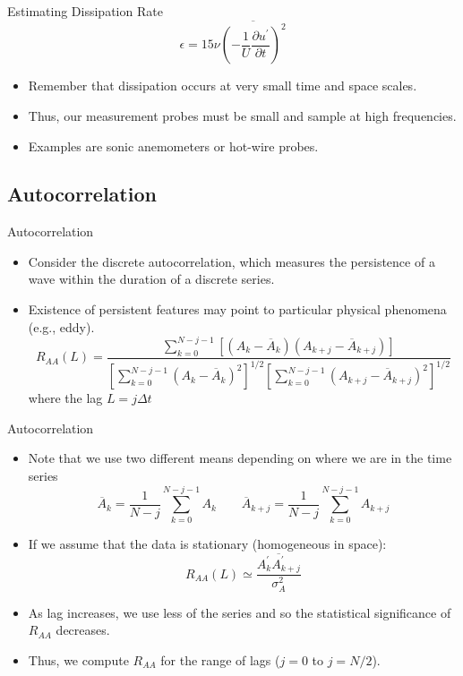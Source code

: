 \begin{frame}{Estimating Dissipation Rate}
$$\epsilon = 15\nu \overline{\left(-\frac{1}{U}\frac{\partial u^\prime}{\partial t}\right)^2}$$
\begin{itemize}
	\item Remember that dissipation occurs at very small time and space scales.
	\item Thus, our measurement probes must be small and sample at high frequencies.
	\item Examples are sonic anemometers or hot-wire probes.
\end{itemize}
\end{frame}

\subsection{Autocorrelation} %
\begin{frame}{Autocorrelation}

\begin{itemize}
	\item Consider the discrete autocorrelation, which measures the persistence of a wave within the duration of a discrete series.
	\item Existence of persistent features may point to particular physical phenomena (e.g., eddy).
	$$R_{AA} (L) = \frac{\displaystyle \sum\limits_{k=0}^{N-j-1} \left[ \left(A_k - \overline{A}_k\right)\left(A_{k+j}-\overline{A}_{k+j}\right)\right]} {\left[\displaystyle \sum\limits_{k=0}^{N-j-1} \left(A_k - \overline{A}_k \right)^2\right]^{1/2} \left[\displaystyle \sum\limits_{k=0}^{N-j-1} \left(A_{k+j} - \overline{A}_{k+j} \right)^2\right]^{1/2}}$$
	where the lag $L=j\Delta t$
\end{itemize}
\end{frame}
\begin{frame}{Autocorrelation}

\begin{itemize}
	\item Note that we use two different means depending on where we are in the time series
	$$\overline{A}_k = \frac{1}{N-j}\displaystyle \sum\limits_{k=0}^{N-j-1} A_k \qquad \overline{A}_{k+j} = \frac{1}{N-j}\displaystyle \sum\limits_{k=0}^{N-j-1} A_{k+j}$$
	\item If we assume that the data is stationary (homogeneous in space):
	$$R_{AA}(L) \simeq \frac{\overline{A_k^\prime A_{k+j}^\prime}}{\sigma_A^2}$$
	\item As lag increases, we use less of the series and so the statistical significance of $R_{AA}$ decreases.
	\item Thus, we compute $R_{AA}$ for the range of lags ($j=0$ to $j=N/2$). 
\end{itemize}
\end{frame}
